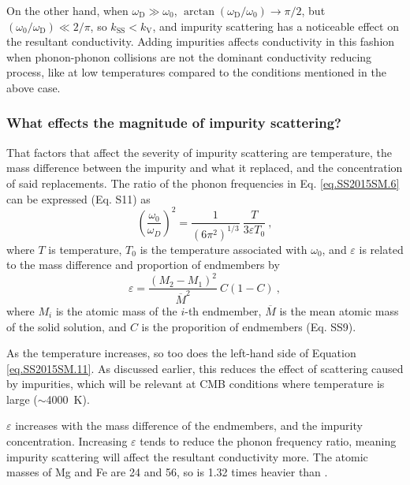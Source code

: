 On the other hand, when $\omega_{\mathrm{D}}\gg\omega_{\mathrm{0}}$, $\arctan(\omega_{\mathrm{D}}/\omega_{\mathrm{0}})\rightarrow\pi/2$, but $(\omega_{\mathrm{0}}/\omega_{\mathrm{D}})\ll 2/\pi$, so $k_{\mathrm{SS}} < k_{\mathrm{V}}$, and impurity scattering has a noticeable effect on the resultant conductivity. Adding impurities affects conductivity in this fashion when phonon-phonon collisions are not the dominant conductivity reducing process, like at low temperatures compared to the conditions mentioned in the above case.

\subsubsection{What effects the magnitude of impurity scattering?} 

That factors that affect the severity of impurity scattering are temperature, the mass difference between the impurity and what it replaced, and the concentration of said replacements. The ratio of the phonon frequencies in Eq. \ref{eq.SS2015SM.6} can be expressed (Eq. S11) as
%
\begin{equation}
\left ( \frac{\omega_{0}}{\omega_{D}} \right )^{2} = \frac{1}{\left ( 6\pi^{2} \right )^{1/3}} \ \frac{T}{3 \varepsilon T_{0}} \ ,
\label{eq.SS2015SM.11}
\end{equation}
%
where $T$ is temperature, $T_{\mathrm{0}}$ is the temperature associated with $\omega_{0}$, and $\varepsilon$ is related to the mass difference and proportion of endmembers by
%
\begin{equation}
\varepsilon = \frac{\left (M_{2}-M_{1}  \right )^{2}}{\overline{M}^{2}} \ C\left ( 1-C \right ) \ ,
\label{eq.SS2015SM.9}
\end{equation}
%
where $M_{i}$ is the atomic mass of the $i$-th endmember, $\overline{M}$ is the mean atomic mass of the solid solution, and $C$ is the proporition of endmembers (Eq. SS9).

As the temperature increases, so too does the left-hand side of Equation \ref{eq.SS2015SM.11}. As discussed earlier, this reduces the effect of scattering caused by impurities, which will be relevant at CMB conditions where temperature is large ($\sim$4000~K). 

$\varepsilon$ increases with the mass difference of the endmembers, and the impurity concentration. Increasing $\varepsilon$ tends to reduce the phonon frequency ratio, meaning impurity scattering will affect the resultant conductivity more. The atomic masses of Mg and Fe are 24 and 56, so \fesios is 1.32 times heavier than \mgsio. 

